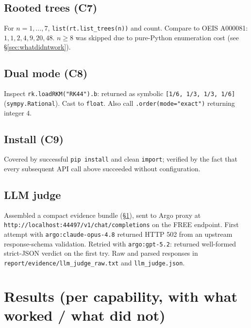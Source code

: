 \documentclass[11pt]{article}
\begin{document}
\subsection{Rooted trees (C7)}
For \(n=1,\dots,7\), \texttt{list(rt.list\_trees(n))} and count. Compare to OEIS
A000081: \(1,1,2,4,9,20,48\). \(n\ge 8\) was skipped due to pure-Python enumeration
cost (see \S\ref{sec:whatdidntwork}).

\subsection{Dual mode (C8)}
Inspect \texttt{rk.loadRKM("RK44").b}: returned as symbolic \texttt{[1/6, 1/3, 1/3, 1/6]}
(\texttt{sympy.Rational}). Cast to \texttt{float}. Also call \texttt{.order(mode="exact")}
returning integer \(4\).

\subsection{Install (C9)}
Covered by successful \texttt{pip install} and clean \texttt{import}; verified by
the fact that every subsequent API call above succeeded without configuration.

\subsection{LLM judge}
Assembled a compact evidence bundle (\S\ref{sec:whatworked}), sent to Argo proxy at
\texttt{http://localhost:44497/v1/chat/completions} on the FREE endpoint. First attempt
with \texttt{argo:claude-opus-4.8} returned HTTP 502 from an upstream response-schema
validation. Retried with \texttt{argo:gpt-5.2}: returned well-formed strict-JSON
verdict on the first try. Raw and parsed responses in
\texttt{report/evidence/llm\_judge\_raw.txt} and \texttt{llm\_judge.json}.

\section{Results (per capability, with what worked / what did not)}
\label{sec:whatworked}
\end{document}
